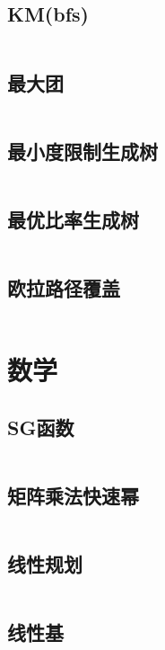 \documentclass[UTF8]{ctexart}
\begin{document}
\subsection{KM(bfs)}
\inputminted{cpp}{graphtheory/KM_bfs.cpp}

\subsection{最大团}
\inputminted{cpp}{graphtheory/最大团.cpp}

\subsection{最小度限制生成树}
\inputminted{cpp}{graphtheory/最小度限制生成树.cpp}

\subsection{最优比率生成树}
\inputminted{cpp}{graphtheory/最优比率生成树.cpp}

\subsection{欧拉路径覆盖}
\inputminted{cpp}{graphtheory/欧拉路径覆盖.cpp}

\section{数学}



\subsection{SG函数}
\inputminted{cpp}{math/SG函数.cpp}

\subsection{矩阵乘法快速幂}
\inputminted{cpp}{math/矩阵乘法快速幂.cpp}

\subsection{线性规划}
\inputminted{cpp}{math/线性规划.cpp}

\subsection{线性基}
\inputminted{cpp}{math/线性基.cpp}
\end{document}
